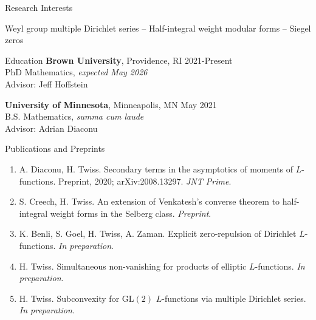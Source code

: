\documentclass{resume} %
\begin{document}
\begin{rSection}{Research Interests}
    \begin{center}Weyl group multiple Dirichlet series -- Half-integral weight modular forms -- Siegel zeros\end{center}
\end{rSection}

\begin{rSection}{Education}
    {\bf Brown University}, Providence, RI \hfill {2021-Present} \\
    PhD Mathematics, \textit{expected May 2026} \\
    \hphantom{\quad}Advisor: Jeff Hoffstein

    {\bf University of Minnesota}, Minneapolis, MN \hfill {May 2021} \\
    B.S. Mathematics, \textit{summa cum laude} \\
    \hphantom{\quad}Advisor: Adrian Diaconu
\end{rSection}

\begin{rSection}{Publications and Preprints}
    \begin{enumerate}
        \item {A. Diaconu, H. Twiss. Secondary terms in the asymptotics of moments of $L$-functions. Preprint,
        2020; arXiv:2008.13297. \textit{JNT Prime}.}
        \item {S. Creech, H. Twiss. An extension of Venkatesh's converse theorem to half-integral weight forms in the Selberg class. \textit{Preprint}.}
        \item {K. Benli, S. Goel, H. Twiss, A. Zaman. Explicit zero-repulsion of Dirichlet $L$-functions. \textit{In preparation}.}
        \item {H. Twiss. Simultaneous non-vanishing for products of elliptic $L$-functions. \textit{In preparation}.}
        \item {H. Twiss. Subconvexity for $\mathrm{GL}(2)$ $L$-functions via multiple Dirichlet series. \textit{In preparation}.}
    \end{enumerate}
\end{rSection}
\end{document}
